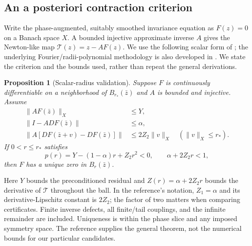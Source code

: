 \documentclass[11pt]{article}
\newtheorem{proposition}{Proposition}[section]
\begin{document}
\subsection{An a posteriori contraction criterion}
Write the phase-augmented, suitably smoothed invariance equation as $F(z)=0$
on a Banach space $X$. A bounded injective approximate inverse $A$ gives the
Newton-like map $\mathcal T(z)=z-AF(z)$. We use the following scalar form of
\citet[Theorem~2.4 and Sections~2.3--2.5]{validatedDFT2026}; the underlying
Fourier/radii-polynomial methodology is also developed in
\citet{lessard2016,framework2017}. We state the criterion and the bounds used,
rather than repeat the general derivations.

\begin{proposition}[Scalar-radius validation]
\label{prop:radii}
Suppose $F$ is continuously differentiable on a neighborhood of
$B_{r_*}(\bar z)$ and $A$ is bounded and injective. Assume
\begin{align}
 \|AF(\bar z)\|_X&\leq Y,\\
 \|I-ADF(\bar z)\|&\leq\alpha,\\
 \|A[DF(\bar z+v)-DF(\bar z)]\|&\leq2Z_2\|v\|_X
 \quad(\|v\|_X\leq r_*).
\end{align}
If $0<r\leq r_*$ satisfies
\begin{equation}
 p(r)=Y-(1-\alpha)r+Z_2r^2<0,
 \qquad \alpha+2Z_2r<1,
 \label{eq:scalar-radii}
\end{equation}
then $F$ has a unique zero in $B_r(\bar z)$.
\end{proposition}
Here $Y$ bounds the preconditioned residual and
$Z(r)=\alpha+2Z_2r$ bounds the derivative of $\mathcal T$ throughout the ball.
In the reference's notation, $Z_1=\alpha$ and its derivative-Lipschitz
constant is $2Z_2$; the factor of two matters when comparing certificates.
Finite inverse defects, all finite/tail couplings, and the infinite remainder
are included. Uniqueness is within the phase slice and any imposed symmetry
space. The reference supplies the general theorem, not the numerical bounds
for our particular candidates.
\end{document}
